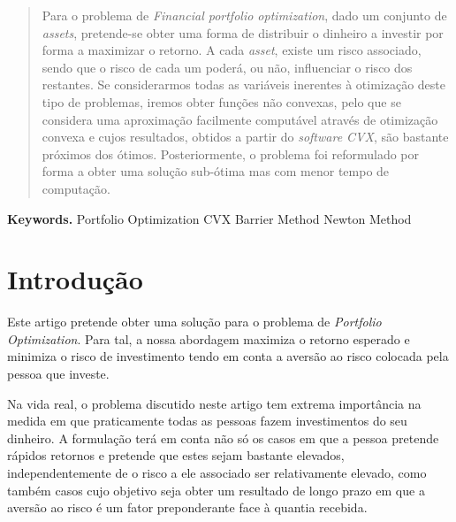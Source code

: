 \documentclass[a4paper]{IEEEtran}
\begin{document}
\maketitle

\begin{abstract}
 Para o problema de \textit{Financial portfolio optimization}, dado um conjunto de \textit{assets}, pretende-se obter uma forma de distribuir o dinheiro a investir por forma a maximizar o retorno. A cada \textit{asset}, existe um risco associado, sendo que o risco de cada um poderá, ou não, influenciar o risco dos restantes.
Se considerarmos todas as variáveis inerentes à otimização deste tipo de problemas, iremos obter funções não convexas, pelo que se considera uma aproximação facilmente computável através de otimização convexa e cujos resultados, obtidos a partir do \textit{software CVX}, são bastante próximos dos ótimos. 
Posteriormente, o problema foi reformulado por forma a obter uma solução sub-ótima mas com menor tempo de computação. 
\end{abstract}

\smallskip
\noindent \textbf{Keywords.} Portfolio Optimization \textbullet CVX \textbullet Barrier Method \textbullet Newton Method

\section{Introdução}
\label{sec:introduction}
Este artigo pretende obter uma solução para o problema de \textit{Portfolio Optimization}. Para tal, a nossa abordagem maximiza o retorno esperado e minimiza o risco de investimento tendo em conta a aversão ao risco colocada pela pessoa que investe.

Na vida real, o problema discutido neste artigo tem extrema importância na medida em que praticamente todas as pessoas fazem investimentos do seu dinheiro. A formulação terá em conta não só os casos em que a pessoa pretende rápidos retornos e pretende que estes sejam bastante elevados, independentemente de o risco a ele associado ser relativamente elevado, como também casos cujo objetivo seja obter um resultado de longo prazo em que a aversão ao risco é um fator preponderante face à quantia recebida.
\end{document}
